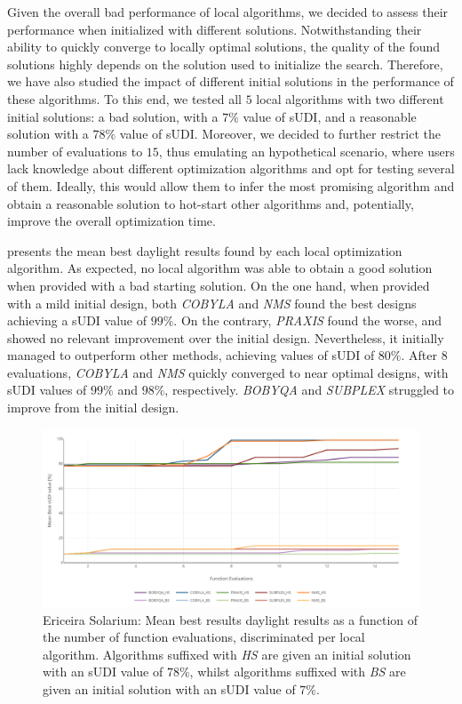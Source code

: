 Given the overall bad performance of local algorithms, we decided to assess their performance when initialized with different solutions. Notwithstanding their ability to quickly converge to locally optimal solutions, the quality of the found solutions highly depends on the solution used to initialize the search. Therefore, we have also studied the impact of different initial solutions in the performance of these algorithms. To this end, we tested all $5$ local algorithms with two different initial solutions: a bad solution, with a $7\%$ value of \ac{sUDI}, and a reasonable solution with a $78\%$ value of \ac{sUDI}. Moreover, we decided to further restrict the number of evaluations to $15$, thus emulating an hypothetical scenario, where users lack knowledge about different optimization algorithms and opt for testing several of them. Ideally, this would allow them to infer the most promising algorithm and obtain a reasonable solution to hot-start other algorithms and, potentially, improve the overall optimization time.

 presents the mean best daylight results found by each local optimization algorithm. As expected, no local algorithm was able to obtain a good solution when provided with a bad starting solution. On the one hand, when provided with a mild initial design, both \textit{COBYLA} and \textit{NMS} found the best designs achieving a \ac{sUDI} value of $99\%$. On the contrary, \textit{PRAXIS} found the worse, and showed no relevant improvement over the initial design. Nevertheless, it initially managed to outperform other methods, achieving values of \ac{sUDI} of $80\%$. After $8$ evaluations, \textit{COBYLA} and \textit{NMS} quickly converged to near optimal designs, with \ac{sUDI} values of $99\%$ and $98\%$, respectively. \textit{BOBYQA} and \textit{SUBPLEX} struggled to improve from the initial design.
\begin{figure}[htbp]
	\centering
	\includegraphics[width=\textwidth]{Images/Evaluation/Ericeira_results_ph2.PNG}
	\caption[Ericeira Solarium: Mean best results of daylight performance in function of the number of evaluations, discriminated per local algorithm]{Ericeira Solarium: Mean best results daylight results as a function of the number of function evaluations, discriminated per local algorithm. Algorithms suffixed with \textit{HS} are given an initial solution with an \ac{sUDI} value of $78\%$, whilst algorithms suffixed with \textit{BS} are given an initial solution with an \ac{sUDI} value of $7\%$.}
	\label{fig:phase2results}
\end{figure}


